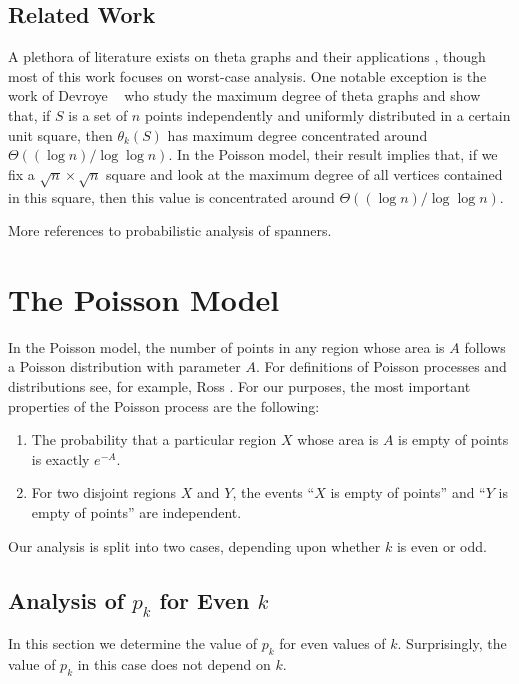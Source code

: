 \documentclass{patmorin}
\begin{document}
\subsection{Related Work}

A plethora of literature exists on theta graphs \cite{S} and
their applications \cite{S}, though most of this work focuses on
worst-case analysis.  One notable exception is the work of Devroye \etal\
\cite{dgmXX} who study the maximum degree of theta graphs and show that,
if $S$ is a set of $n$ points independently and uniformly distributed in a
certain unit square, then $\theta_k(S)$ has maximum degree concentrated
around $\Theta((\log n)/\log\log n)$.  In the Poisson model, their
result implies that, if we fix a $\sqrt{n}\times\sqrt{n}$ square and
look at the maximum degree of all vertices contained in this square,
then this value is concentrated around $\Theta((\log n)/\log\log n)$.

More references to probabilistic analysis of spanners.

\section{The Poisson Model}

In the Poisson model, the number of points in any region whose
area is $A$ follows a Poisson distribution with parameter $A$.  For
definitions of Poisson processes and distributions see, for example,
Ross \cite[Chapter~2]{ross:introduction}.  For our purposes, the most
important properties of the Poisson process are the following:
\begin{enumerate}
\item The probability  that a particular region $X$ whose area is $A$
   is empty of points is exactly $e^{-A}$.
\item For two disjoint regions $X$ and $Y$, the events ``$X$ is empty
   of points'' and ``$Y$ is empty of points'' are independent.
\end{enumerate}
Our analysis is split into two cases, depending upon whether $k$ is even
or odd.


\subsection{Analysis of $p_k$ for Even $k$}

In this section we determine the value of $p_k$ for even values of $k$.
Surprisingly, the value of $p_k$ in this case does not depend on $k$.
\end{document}
